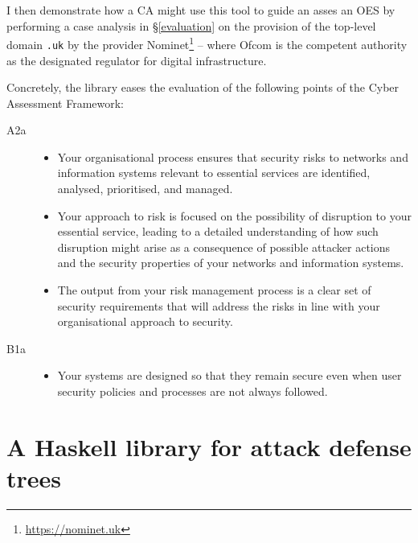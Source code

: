 \documentclass{scrreprt}
\begin{document}
I then demonstrate how a CA might use this tool to guide an asses an OES by
performing a case analysis in \S\ref{evaluation} on the provision of the
top-level domain \texttt{.uk} by the provider
Nominet\footnote{\url{https://nominet.uk}} -- where Ofcom is the competent
authority as the designated regulator for digital infrastructure.


Concretely, the library eases the evaluation of the following points of the
Cyber Assessment Framework:

\begin{description}
    \item [A2a]
        \begin{itemize}
            \item Your organisational process ensures that security risks to
                networks and information systems relevant to essential services
                are identified, analysed, prioritised, and managed.
            \item Your approach to risk is focused on the possibility of
                disruption to your essential service, leading to a detailed
                understanding of how such disruption might arise as a
                consequence of possible attacker actions and the security
                properties of your networks and information systems.
            \item The output from your risk management process is a clear set of
                security requirements that will address the risks in line with
                your organisational approach to security.
        \end{itemize}

    \item [B1a]
        \begin{itemize}
            \item Your systems are designed so that they remain secure even when
                user security policies and processes are not always followed.
        \end{itemize}
\end{description}

\chapter{A Haskell library for attack defense trees}
\label{tool}
\end{document}
